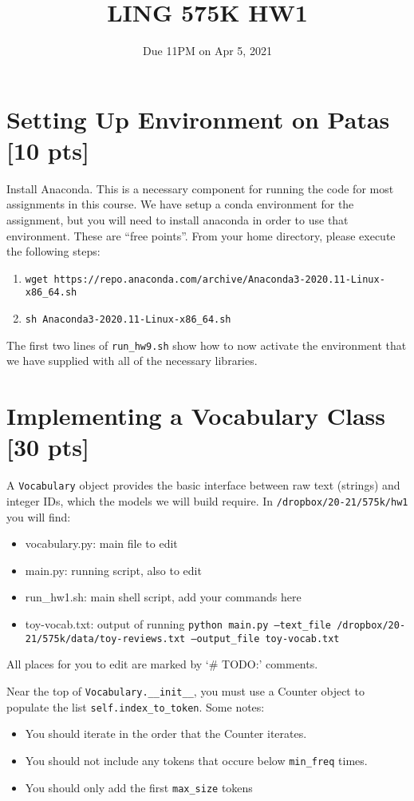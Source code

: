 \documentclass[11pt]{article}
\begin{document}
\title{LING 575K HW1}
\date{\vspace{-0.2in}Due 11PM on Apr 5, 2021}
\maketitle


\section{Setting Up Environment on Patas [10 pts]}

Install Anaconda. This is a necessary component for running the code for most assignments in this course.  We have setup a conda environment for the assignment, but you will need to install anaconda in order to use that environment.  These are ``free points''.  From your home directory, please execute the following steps:
\begin{enumerate}
	\item \texttt{wget https://repo.anaconda.com/archive/Anaconda3-2020.11-Linux-x86\_64.sh}
	\item \texttt{sh Anaconda3-2020.11-Linux-x86\_64.sh}
\end{enumerate}
The first two lines of \texttt{run\_hw9.sh} show how to now activate the environment that we have supplied with all of the necessary libraries.


\section{Implementing a Vocabulary Class [30 pts]}

A \texttt{Vocabulary} object provides the basic interface between raw text (strings) and integer IDs, which the models we will build require.  In \texttt{/dropbox/20-21/575k/hw1} you will find:
\begin{itemize}
  \item vocabulary.py: main file to edit
  \item main.py: running script, also to edit
  \item run\_hw1.sh: main shell script, add your commands here
  \item toy-vocab.txt: output of running \texttt{python main.py --text\_file /dropbox/20-21/575k/data/toy-reviews.txt --output\_file toy-vocab.txt}
\end{itemize}
All places for you to edit are marked by `\# TODO:' comments.

\vspace{2em}
 Near the top of \texttt{Vocabulary.\_\_init\_\_}, you must use a Counter object to populate the list \texttt{self.index\_to\_token}.  Some notes:
\begin{itemize}
  \item You should iterate in the order that the Counter iterates.
  \item You should not include any tokens that occure below \texttt{min\_freq} times.
  \item You should only add the first \texttt{max\_size} tokens
\end{itemize}
\end{document}
